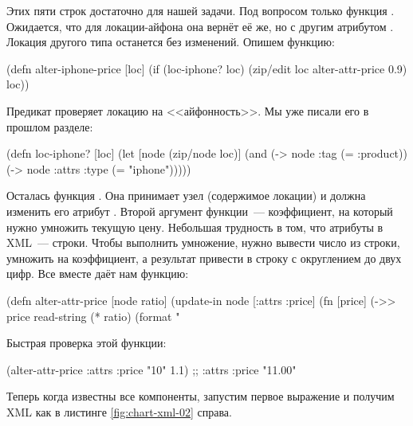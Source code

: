 Этих пяти строк достаточно для нашей задачи. Под вопросом только функция
. Ожидается, что для локации-айфона она вернёт её же, но с
другим атрибутом . Локация другого типа останется без изменений. Опишем
функцию:

\begin{english}
  \begin{clojure}
(defn alter-iphone-price [loc]
  (if (loc-iphone? loc)
    (zip/edit loc alter-attr-price 0.9)
    loc))
  \end{clojure}
\end{english}

Предикат  проверяет локацию на <<айфонность>>. Мы уже писали его в
прошлом разделе:

\begin{english}
  \begin{clojure}
(defn loc-iphone? [loc]
  (let [node (zip/node loc)]
    (and (-> node :tag (= :product))
         (-> node :attrs :type (= "iphone")))))
  \end{clojure}
\end{english}

Осталась функция . Она принимает узел (содержимое локации) и
должна изменить его атрибут . Второй аргумент функции~--- коэффициент, на
который нужно умножить текущую цену. Небольшая трудность в том, что атрибуты в
XML~--- строки. Чтобы выполнить умножение, нужно вывести число из строки, умножить
на коэффициент, а результат привести в строку с округлением до двух цифр. Все
вместе даёт нам функцию:

\begin{english}
  \begin{clojure}
(defn alter-attr-price [node ratio]
  (update-in node [:attrs :price]
             (fn [price]
               (->> price
                    read-string
                    (* ratio)
                    (format "%
  \end{clojure}
\end{english}

Быстрая проверка этой функции:

\begin{english}
  \begin{clojure}
(alter-attr-price {:attrs {:price "10"}} 1.1)
;; {:attrs {:price "11.00"}}
  \end{clojure}
\end{english}

Теперь когда известны все компоненты, запустим первое выражение и получим XML
как в листинге \ref{fig:chart-xml-02} справа.

